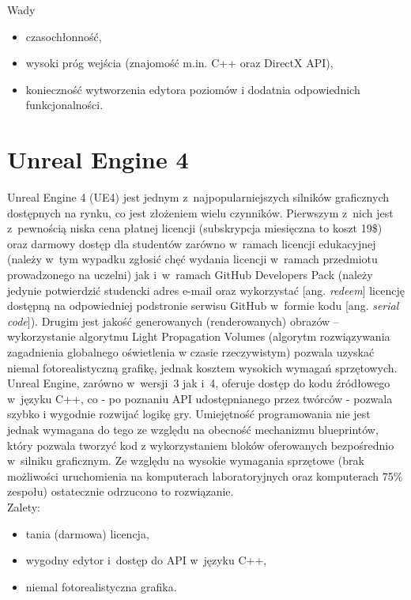 Wady
\begin{itemize}
\item czasochłonność,
\item wysoki próg wejścia (znajomość m.in. C++ oraz DirectX API),
\item konieczność wytworzenia edytora poziomów i dodatnia odpowiednich funkcjonalności.
\end{itemize}

\section{Unreal Engine 4}
Unreal Engine 4 (UE4) jest jednym z~najpopularniejszych silników graficznych dostępnych na rynku, co jest złożeniem wielu czynników. Pierwszym z~nich jest z~pewnością niska cena płatnej licencji (subskrypcja miesięczna to koszt 19\$) oraz darmowy dostęp dla studentów zarówno w~ramach licencji edukacyjnej (należy w~tym wypadku zgłosić chęć wydania licencji w~ramach przedmiotu prowadzonego na uczelni) jak i~w~ramach GitHub Developers Pack (należy jedynie potwierdzić studencki adres e-mail oraz wykorzystać [ang. \emph{redeem}] licencję dostępną na odpowiedniej podstronie serwisu GitHub w~formie kodu [ang. \emph{serial code}]). Drugim jest jakość generowanych (renderowanych) obrazów -- wykorzystanie algorytmu Light Propagation Volumes (algorytm rozwiązywania zagadnienia globalnego oświetlenia w czasie rzeczywistym) pozwala uzyskać niemal fotorealistyczną grafikę, jednak kosztem wysokich wymagań sprzętowych.
Unreal Engine, zarówno w~wersji~3 jak i~4, oferuje dostęp do kodu źródłowego w~języku C++, co - po poznaniu API udostępnianego przez twórców - pozwala szybko i wygodnie rozwijać logikę gry. Umiejętność programowania nie jest jednak wymagana do tego ze względu na obecność mechanizmu blueprintów, który pozwala tworzyć kod z wykorzystaniem bloków oferowanych bezpośrednio w~silniku graficznym.
Ze względu na wysokie wymagania sprzętowe (brak możliwości uruchomienia na komputerach laboratoryjnych oraz komputerach 75\% zespołu) ostatecznie odrzucono to rozwiązanie.\\

Zalety:
\begin{itemize}
\item tania (darmowa) licencja,
\item wygodny edytor i~dostęp do API w~języku C++,
\item niemal fotorealistyczna grafika.
\end{itemize}

